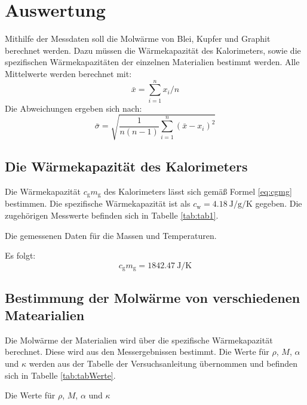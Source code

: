 \section{Auswertung}
\label{sec:Auswertung}

Mithilfe der Messdaten soll die Molwärme von Blei, Kupfer und Graphit berechnet werden. Dazu müssen die Wärmekapazität des Kalorimeters, sowie die spezifischen Wärmekapazitäten der einzelnen Materialien bestimmt werden.
Alle Mittelwerte werden berechnet mit:
\begin{equation}
\bar{x} = \sum_{i=1}^{n}x_i/n \label{eq:quer}
\end{equation}
Die Abweichungen ergeben sich nach:
\begin{equation}
\bar{\sigma} = \sqrt{\frac{1}{n(n-1)}\sum_{i=1}^{n}(\bar{x}-x_i)^2}  \label{eq:sigma}
\end{equation}

\subsection{Die Wärmekapazität des Kalorimeters}

Die Wärmekapazität $c_\text{g}m_\text{g}$ des Kalorimeters lässt sich gemäß Formel \eqref{eq:cgmg} bestimmen. Die spezifische Wärmekapazität ist als $c_\text{w} = \SI{4.18}{\joule\per\gram\per\kelvin}$ \cite{V201} gegeben. Die zugehörigen Messwerte befinden sich in Tabelle \ref{tab:tab1}.
\begin{table}
	\centering
	\caption{Die gemessenen Daten für die Massen und Temperaturen.}
	
	\label{tab:tab1}
\end{table}
Es folgt:
\begin{displaymath}
	c_\text{g}m_\text{g} = \SI{1842,47}{\joule\per\kelvin}
\end{displaymath}
\subsection{Bestimmung der Molwärme von verschiedenen Matearialien}

Die Molwärme der Materialien wird über die spezifische Wärmekapazität berechnet. Diese wird aus den Messergebnissen bestimmt.
Die Werte für $\rho$, $M$, $\alpha$ und $\kappa$ werden aus der Tabelle der Versuchsanleitung\cite{V201} übernommen und befinden sich in Tabelle \ref{tab:tabWerte}.
\begin{table}
	\centering
	\caption{Die Werte für $\rho$, $M$, $\alpha$ und $\kappa$ }
	
	\label{tab:tabWerte}
\end{table}

